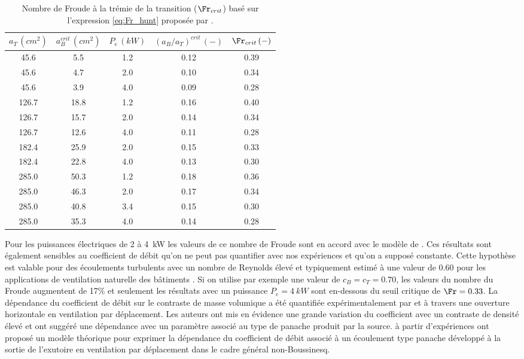 \begin{table}[!h]
  \centering
  \caption{Nombre de Froude à la trémie de la transition ($\Fr_{crit}$) basé sur l'expression \eqref{eq:Fr_hunt} proposée par \textcite{hunt_coffey_2010}.}
  \setlength\extrarowheight{0.5pt}
  \begin{tabular}{ccccc}
    \hline
    $a_T\,(\si{cm^2})$ & $a^{crit}_B\,(\si{cm^2})$ & $P_e\,(\si{kW})$ & $(a_B/a_T)^{crit}\,(-)$ & $\Fr_{crit}\,(-)$ \rule{0pt}{14pt}\\[0.5ex]
    \hline
     45.6 &  5.5 & 1.2 & 0.12 & 0.39 \\
     45.6 &  4.7 & 2.0 & 0.10 & 0.34 \\
     45.6 &  3.9 & 4.0 & 0.09 & 0.28 \\
    \midrule[0.1pt]
    126.7 & 18.8 & 1.2 & 0.16 & 0.40 \\
    126.7 & 15.7 & 2.0 & 0.14 & 0.34 \\
    126.7 & 12.6 & 4.0 & 0.11 & 0.28 \\
    \midrule[0.1pt]
    182.4 & 25.9 & 2.0 & 0.15 & 0.33 \\
    182.4 & 22.8 & 4.0 & 0.13 & 0.30 \\
    \midrule[0.1pt]
    285.0 & 50.3 & 1.2 & 0.18 & 0.36 \\
    285.0 & 46.3 & 2.0 & 0.17 & 0.34 \\
    285.0 & 40.8 & 3.4 & 0.15 & 0.30 \\
    285.0 & 35.3 & 4.0 & 0.14 & 0.28 \\
    \hline
    \end{tabular}
  \label{tab:fr_hunt_bidi}
\end{table}

Pour les puissances électriques de 2 à \SI{4}{kW} les valeurs de ce nombre de Froude sont en accord avec le modèle de \textcite{hunt_coffey_2010}. Ces résultats sont également sensibles au coefficient de débit qu'on ne peut pas quantifier avec nos expériences et qu'on a supposé constante. Cette hypothèse est valable pour des écoulements turbulents avec un nombre de Reynolds élevé \parencite{ward_1980} et typiquement estimé à une valeur de 0.60 pour les applications de ventilation naturelle des bâtiments \parencite{hunt_linden_2001}. Si on utilise par exemple une valeur de $c_B=c_T=0.70$, les valeurs du nombre du Froude augmentent de 17\% et seulement les résultats avec un puissance $P_e=\SI{4}{kW}$ sont en-dessous du seuil critique de $\Fr=0.33$. La dépendance du coefficient de débit sur le contraste de masse volumique a été quantifiée expérimentalement par \textcite{hunt_holford_2000} et \textcite{holford_hunt_2001} à travers une ouverture horizontale en ventilation par déplacement. Les auteurs ont mis en évidence une grande variation du coefficient avec un contraste de densité élevé et ont suggéré une dépendance avec un paramètre associé au type de panache produit par la source. \textcite{vauquelin_2017} à partir d'expériences ont proposé un modèle théorique pour exprimer la dépendance du coefficient de débit associé à un écoulement type panache développé à la sortie de l'exutoire en ventilation par déplacement dans le cadre général non-Boussinesq.

